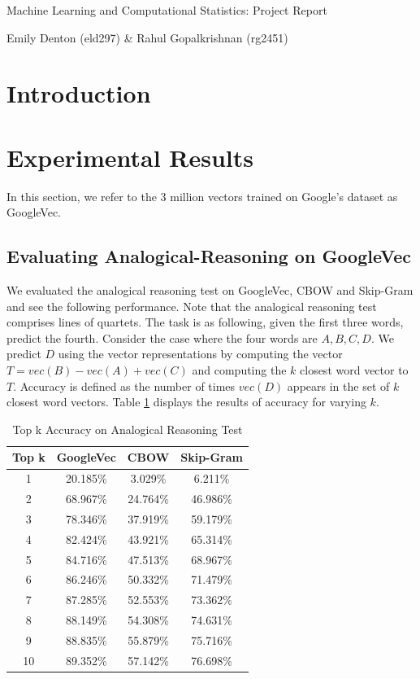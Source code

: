 \documentclass[11pt]{article}
\begin{document}
\vspace*{8cm}

\centerline{\sc \Large Machine Learning and Computational Statistics: Project Report}

\vspace{1cm}

\centerline{\sc \small Emily Denton (eld297)  \& Rahul Gopalkrishnan (rg2451)}
         
\clearpage 


\section{Introduction}

\section{Experimental Results}
In this section, we refer to the 3 million vectors trained on Google's dataset as GoogleVec. 

\subsection{Evaluating Analogical-Reasoning on GoogleVec}
We evaluated the analogical reasoning test on GoogleVec, CBOW and Skip-Gram and see the following performance. Note that the analogical reasoning test comprises lines of quartets. The task is as following, given the first three words, predict the fourth. Consider the case where the four words are $A,B,C,D$. We predict $D$ using the vector representations by computing the vector $T=vec(B)-vec(A)+vec(C)$ and computing the $k$ closest word vector to $T$. Accuracy is defined as the number of times $vec(D)$ appears in the set of $k$ closest word vectors. Table \ref{tab:AnalogicalAcc} displays the results of accuracy for varying $k$.

\begin{table}[h]
	\caption{Top k Accuracy on Analogical Reasoning Test}
	\label{tab:AnalogicalAcc}
	\centering
    \begin{tabular}{| c | c | c | c |}
    \hline
    \textbf{Top k} & \textbf{GoogleVec} & \textbf{CBOW} & \textbf{Skip-Gram}\\ \hline
    1 & 20.185\% & 3.029\% & 6.211\%  \\ \hline
    2 & 68.967\% & 24.764\%& 46.986\% \\ \hline
    3 & 78.346\% & 37.919\%& 59.179\% \\ \hline
    4 & 82.424\% & 43.921\%& 65.314\% \\ \hline
    5 & 84.716\% & 47.513\%& 68.967\% \\ \hline
    6 & 86.246\% & 50.332\%& 71.479\% \\ \hline
    7 & 87.285\% & 52.553\%& 73.362\% \\ \hline
    8 & 88.149\% & 54.308\%& 74.631\% \\ \hline
    9 & 88.835\% & 55.879\%& 75.716\% \\ \hline
    10 & 89.352\% & 57.142\%& 76.698\% \\ \hline
    \end{tabular}
\end{table}
\end{document}
